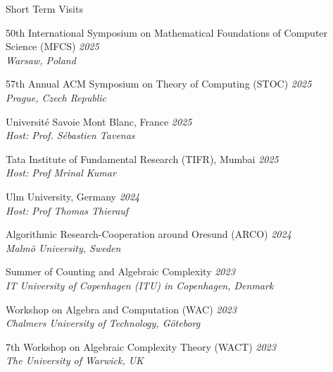 \documentclass{resume} %
\begin{document}


\begin{rSection}{Short Term Visits}
  \item 50th International Symposium on Mathematical Foundations of Computer Science (MFCS) \hfill {\em 2025}
  \\ {\em  Warsaw, Poland}

  \item 57th Annual ACM Symposium on Theory of Computing (STOC) \hfill {\em 2025}
  \\ {\em  Prague, Czech Republic}

  \item {Université Savoie Mont Blanc, France} \hfill {\em 2025}
  \\ {\em Host: Prof. S\'{e}bastien Tavenas}

  \item {Tata Institute of Fundamental Research (TIFR), Mumbai} \hfill {\em 2025}
  \\ {\em Host: Prof Mrinal Kumar}

  \item {Ulm University, Germany} \hfill {\em 2024}
  \\ {\em Host: Prof Thomas Thierauf}

  \item {Algorithmic Research-Cooperation around Oresund (ARCO)} \hfill {\em 2024}
  \\ {\em Malm\"{o} University, Sweden}

  \item Summer of Counting and Algebraic Complexity \hfill {\em 2023} 
  \\ {\em  IT University of  Copenhagen (ITU) in Copenhagen, Denmark}

  \item Workshop on Algebra and Computation (WAC) \hfill {\em 2023}
  \\ {\em Chalmers University of Technology, G\"oteborg}
  \item 7th Workshop on Algebraic Complexity Theory (WACT) \hfill {\em 2023}
  \\ {\em The University of Warwick, UK}


\end{rSection}
\end{document}
